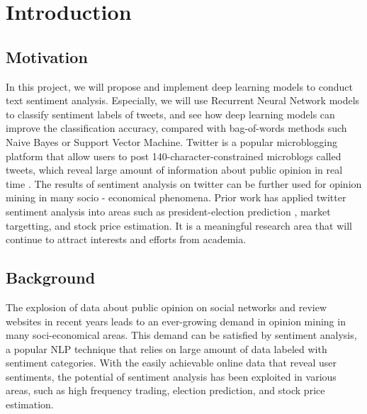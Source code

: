 
\section{Introduction}
\subsection{Motivation}
%
In this project, we will propose and implement deep learning models to conduct text sentiment analysis.
%
Especially, we will use Recurrent Neural Network models to classify sentiment labels of tweets, and see how deep learning models can improve the classification accuracy, compared with bag-of-words methods such Naive Bayes or Support Vector Machine. 
%
Twitter is a popular microblogging platform that allow users to post 140-character-constrained microblogs called tweets, which reveal large amount of information about public opinion in real time \cite{pak2010twitter}. 
%
The results of sentiment analysis on twitter can be further used for opinion mining in many socio - economical phenomena.
Prior work has applied twitter sentiment analysis into areas such as president-election prediction \cite{tumasjan2010predicting,wang2012system}, market targetting\cite{bollen2011modeling}, and stock price estimation\cite{bollen2011twitter}.
% 
It is  a meaningful research area that will continue to attract interests and efforts from academia.

\subsection{Background}
The explosion of data about public opinion on social networks and review websites in recent years leads to an ever-growing demand in opinion mining in many soci-economical areas.
%
This demand can be satisfied by sentiment analysis, a popular NLP technique that relies on large amount of data labeled with sentiment categories.
% 
With the easily achievable online data that reveal user sentiments, the potential of sentiment analysis has been exploited in various areas, such as high frequency trading, election prediction, and stock price estimation.

